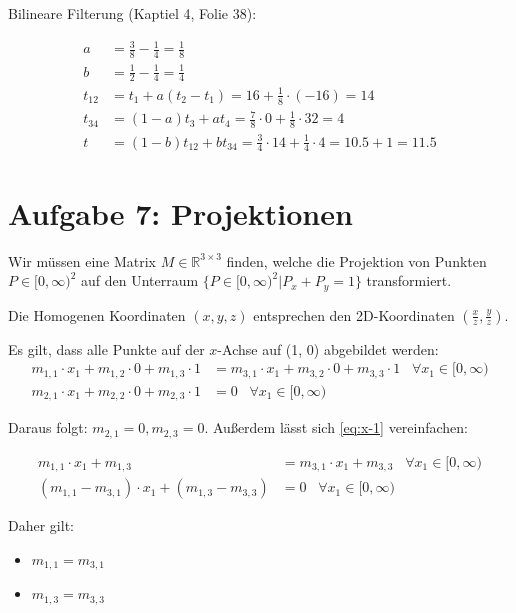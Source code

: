 \documentclass[a4paper]{scrartcl}
\begin{document}
Bilineare Filterung (Kaptiel 4, Folie 38):

\begin{align}
    a &= \frac{3}{8} - \frac{1}{4} = \frac{1}{8}\\
    b &= \frac{1}{2} - \frac{1}{4} = \frac{1}{4}\\
    t_{12} &= t_1 + a(t_2 - t_1) = 16 + \frac{1}{8} \cdot (-16) = 14\\
    t_{34} &= (1-a) t_3 + a t_4 = \frac{7}{8} \cdot 0 + \frac{1}{8} \cdot 32 = 4\\
    t &= (1-b) t_{12} + b t_{34} = \frac{3}{4} \cdot 14 + \frac{1}{4} \cdot 4 = 10.5 + 1 = 11.5
\end{align}

\clearpage
\section*{Aufgabe 7: Projektionen}
Wir müssen eine Matrix $M \in \mathbb{R}^{3 \times 3}$ finden, welche die
Projektion von Punkten $P \in [0, \infty)^2$ auf den Unterraum
$\{P \in [0, \infty)^2 | P_x + P_y = 1\}$ transformiert.

Die Homogenen Koordinaten $(x, y, z)$ entsprechen den 2D-Koordinaten
$(\frac{x}{z}, \frac{y}{z})$.

\goodbreak
Es gilt, dass alle Punkte auf der $x$-Achse auf (1, 0) abgebildet werden:\nobreak
\begin{align}
    m_{1,1} \cdot x_1 + m_{1,2} \cdot 0 + m_{1,3} \cdot 1 &= m_{3,1} \cdot x_1 + m_{3,2} \cdot 0 + m_{3,3} \cdot 1 \;\;\; \forall x_1 \in [0, \infty) \label{eq:x-1}\\
    m_{2,1} \cdot x_1 + m_{2,2} \cdot 0 + m_{2,3} \cdot 1 &= 0 \;\;\; \forall x_1 \in [0, \infty)
\end{align}

Daraus folgt: $m_{2,1} = 0, m_{2,3} = 0$. Außerdem lässt sich \cref{eq:x-1}
vereinfachen:

\begin{align}
    m_{1,1} \cdot x_1 +  m_{1,3} &= m_{3,1} \cdot x_1 + m_{3,3} \;\;\; \forall x_1 \in [0, \infty)\\
    (m_{1,1} - m_{3,1}) \cdot x_1 + (m_{1,3} - m_{3,3}) &= 0 \;\;\; \forall x_1 \in [0, \infty)\label{eq:x-1.1}
\end{align}

Daher gilt:

\begin{itemize}
    \item $m_{1,1} = m_{3,1}$
    \item $m_{1,3} = m_{3,3}$
\end{itemize}
\end{document}
